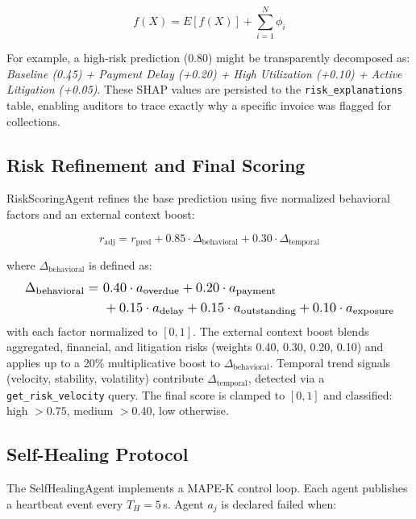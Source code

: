 \documentclass[runningheads]{llncs}
\begin{document}
\begin{equation}
f(X) = E[f(X)] + \sum_{i=1}^{N} \phi_i
\label{eq:shap}
\end{equation}

For example, a high-risk prediction ($0.80$) might be transparently decomposed as: \textit{Baseline (0.45) + Payment Delay (+0.20) + High Utilization (+0.10) + Active Litigation (+0.05)}. These SHAP values are persisted to the \texttt{risk\allowbreak \_explanations} table, enabling auditors to trace exactly why a specific invoice was flagged for collections.

\subsection{Risk Refinement and Final Scoring}

RiskScoringAgent refines the base prediction using five normalized behavioral factors and an external context boost:

\begin{equation}
r_{\text{adj}} = r_{\text{pred}} + 0.85\cdot\Delta_{\text{behavioral}} + 0.30\cdot\Delta_{\text{temporal}}
\label{eq:refinement}
\end{equation}

where $\Delta_{\text{behavioral}}$ is defined as:
\begin{equation}
\resizebox{0.95\columnwidth}{!}{$
\begin{split}
\Delta_{\text{behavioral}} =\ &0.40\cdot a_{\text{overdue}} + 0.20\cdot a_{\text{payment}} \\
&+ 0.15\cdot a_{\text{delay}} + 0.15\cdot a_{\text{outstanding}} + 0.10\cdot a_{\text{exposure}}
\end{split}
$}
\end{equation}
with each factor normalized to $[0,1]$. The external context boost blends aggregated, financial, and litigation risks (weights 0.40, 0.30, 0.20, 0.10) and applies up to a 20\% multiplicative boost to $\Delta_{\text{behavioral}}$. Temporal trend signals (velocity, stability, volatility) contribute $\Delta_{\text{temporal}}$, detected via a \texttt{get\_risk\_velocity} query. The final score is clamped to $[0,1]$ and classified: high $>0.75$, medium $>0.40$, low otherwise.

\subsection{Self-Healing Protocol}

The SelfHealingAgent implements a MAPE-K control loop. Each agent publishes a heartbeat event every $T_H=5$\,s. Agent $a_j$ is declared failed when:
\end{document}
